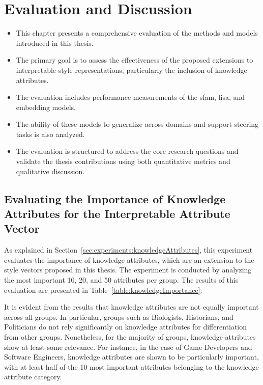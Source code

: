 \chapter{Evaluation and Discussion}%
\label{sec:evaluation}
\begin{itemize}
  \item This chapter presents a comprehensive evaluation of the methods and models introduced in this thesis.
  \item The primary goal is to assess the effectiveness of the proposed extensions to interpretable style representations, particularly the inclusion of knowledge attributes.
  \item The evaluation includes performance measurements of the \ac{sfam}, \ac{lisa}, and embedding models.
  \item The ability of these models to generalize across domains and support steering tasks is also analyzed.
  \item The evaluation is structured to address the core research questions and validate the thesis contributions using both quantitative metrics and qualitative discussion.
\end{itemize}


\section{Evaluating the Importance of Knowledge Attributes for the Interpretable Attribute Vector}%
\label{sec:evaluation:knowledgeAttributes}

As explained in Section~\ref{sec:experiments:knowledgeAttributes}, this experiment evaluates the importance of knowledge attributes, which are an extension to the style vectors proposed in this thesis. The experiment is conducted by analyzing the most important \num{10}, \num{20}, and \num{50} attributes per group. The results of this evaluation are presented in Table~\ref{table:knowledgeImportance}.

It is evident from the results that knowledge attributes are not equally important across all groups. In particular, groups such as Biologists, Historians, and Politicians do not rely significantly on knowledge attributes for differentiation from other groups. Nonetheless, for the majority of groups, knowledge attributes show at least some relevance. For instance, in the case of Game Developers and Software Engineers, knowledge attributes are shown to be particularly important, with at least half of the \num{10} most important attributes belonging to the knowledge attribute category.

